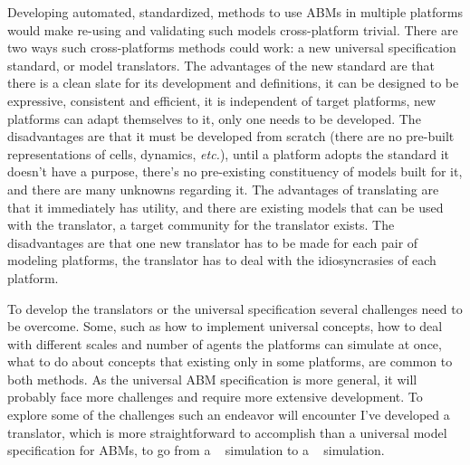 Developing automated, standardized, methods to use ABMs in multiple platforms would make re-using and validating such models cross-platform trivial. There are two ways such cross-platforms methods could work: a new universal specification standard, or model translators. The advantages of the new standard are that there is a clean slate for its development and definitions, it can be designed to be expressive, consistent and efficient, it is independent of target platforms, new platforms can adapt themselves to it, only one needs to be developed. The disadvantages are that it must be developed from scratch (there are no pre-built representations of cells, dynamics, \textit{etc.}), until a platform adopts the standard it doesn't have a purpose, there's no pre-existing constituency of models built for it, and there are many unknowns regarding it. The advantages of translating are that it immediately has utility, and there are existing models that can be used with the translator, a target community for the translator exists. The disadvantages are that one new translator has to be made for each pair of modeling platforms, the translator has to deal with the idiosyncrasies of each platform. 

To develop the translators or the universal specification
several challenges need to be overcome. Some, such as how to implement universal concepts, how to deal with different scales and number of agents the platforms can simulate at once, what to do about concepts that existing only in some platforms, are common to both methods. As the universal ABM specification is more general, it will probably face more challenges and require more extensive development. To explore some of the challenges such an endeavor will encounter I've developed a translator, which is more straightforward to accomplish than a universal model specification for ABMs, to go from a \psc~\cite{ghaffarizadeh_physicell_2018} simulation to a \ccd~\cite{swat_multi-scale_2012} simulation.




